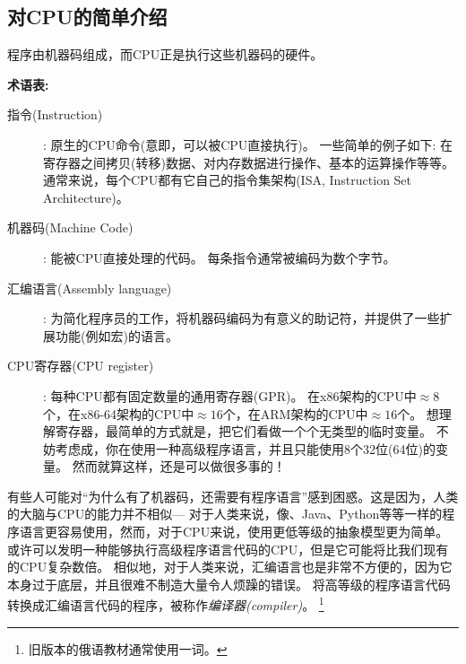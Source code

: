 \subsection{对CPU的简单介绍}

程序由机器码组成，而\ac{CPU}正是执行这些机器码的硬件。

\textbf{术语表:}

\begin{description}
\item[指令(Instruction)]: 原生的\ac{CPU}命令(意即，可以被CPU直接执行)。
一些简单的例子如下: 在寄存器之间拷贝(转移)数据、对内存数据进行操作、基本的运算操作等等。
通常来说，每个\ac{CPU}都有它自己的指令集架构(\ac{ISA}, Instruction Set Architecture)。

\item[机器码(Machine Code)]: 能被\ac{CPU}直接处理的代码。
每条指令通常被编码为数个字节。
\item[汇编语言(Assembly language)]: 为简化程序员的工作，将机器码编码为有意义的助记符，并提供了一些扩展功能(例如宏)的语言。
\item[CPU寄存器(CPU register)]: 每种\ac{CPU}都有固定数量的通用寄存器(\ac{GPR})。
在x86架构的CPU中$\approx 8$个，在x86-64架构的CPU中$\approx 16$个，在ARM架构的CPU中$\approx 16$个。
想理解寄存器，最简单的方式就是，把它们看做一个个无类型的临时变量。
不妨考虑成，你在使用一种高级\ac{程序语言}，并且只能使用8个32位(64位)的变量。
然而就算这样，还是可以做很多事的！
\end{description}




有些人可能对“为什么有了机器码，还需要有\ac{程序语言}”感到困惑。这是因为，人类的大脑与\ac{CPU}的能力并不相似---%
对于人类来说，像\CCpp、Java、Python等等一样的\ac{程序语言}更容易使用，然而，对于\ac{CPU}来说，使用更低等级的抽象模型更为简单。
或许可以发明一种能够执行高级\ac{程序语言}代码的\ac{CPU}，但是它可能将比我们现有的\ac{CPU}复杂数倍。
相似地，对于人类来说，汇编语言也是非常不方便的，因为它本身过于底层，并且很难不制造大量令人烦躁的错误。
将高等级的\ac{程序语言}代码转换成汇编语言代码的程序，被称作\emph{编译器(compiler)}。
\footnote{旧版本的俄语教材通常使用一词。}

